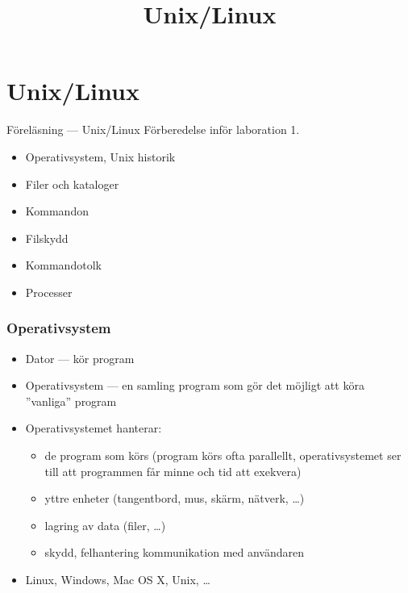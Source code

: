 
\title{Unix/Linux}
\section{Unix/Linux}

\begin{frame}
\label{unix}
\begin{block}{\centering\Large Föreläsning  --- Unix/Linux}
Förberedelse inför laboration 1.

\begin{itemize}
\item Operativsystem, Unix historik
\item Filer och kataloger
\item Kommandon
\item Filskydd
\item Kommandotolk
\item Processer
\end{itemize}
\end{block}
\end{frame}


\begin{frame}[fragile=singleslide]
\frametitle{Operativsystem}
\begin{itemize}
\item Dator --- kör program
\item Operativsystem --- en samling program som gör det möjligt att köra ''vanliga'' program
\item Operativsystemet hanterar:
\begin{itemize}
\item de program som körs (program körs ofta parallellt, operativsystemet ser till att programmen får minne och tid att exekvera)
\item yttre enheter (tangentbord, mus, skärm, nätverk, \ldots)
\item lagring av data (filer, \ldots)
\item skydd, felhantering
kommunikation med användaren
\end{itemize}

\item Linux, Windows, Mac OS X, Unix, \ldots
\end{itemize}
\end{frame} 

